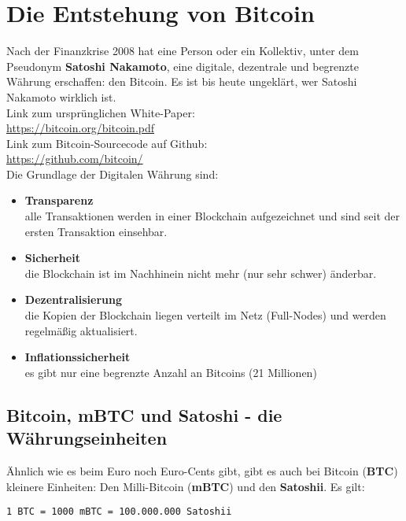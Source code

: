 \documentclass[10pt,a4paper,titlepage]{article}
\begin{document}
\section{Die Entstehung von Bitcoin}
Nach der Finanzkrise 2008 hat eine Person oder ein Kollektiv, unter dem Pseudonym \textbf{Satoshi Nakamoto}, eine digitale, dezentrale und begrenzte Währung erschaffen: den Bitcoin. Es ist bis heute ungeklärt, wer Satoshi Nakamoto wirklich ist.\vspace{.3cm}\\
Link zum ursprünglichen White-Paper:\\
\href{https://bitcoin.org/bitcoin.pdf}{\color{blue}https://bitcoin.org/bitcoin.pdf}\vspace{.3cm}\\
Link zum Bitcoin-Sourcecode auf Github:\\
\href{https://github.com/bitcoin/}{\color{blue}https://github.com/bitcoin/} \vspace{.3cm}\\
Die Grundlage der Digitalen Währung sind:
\begin{itemize}
\item \textbf{Transparenz}\\alle Transaktionen werden in einer Blockchain aufgezeichnet und sind seit der ersten Transaktion einsehbar.
\item \textbf{Sicherheit}\\die Blockchain ist im Nachhinein nicht mehr (nur sehr schwer) änderbar.
\item \textbf{Dezentralisierung}\\die Kopien der Blockchain liegen verteilt im Netz (Full-Nodes) und werden regelmäßig aktualisiert.
\item \textbf{Inflationssicherheit}\\es gibt nur eine begrenzte Anzahl an Bitcoins (21 Millionen)  
\end{itemize} 

\subsection{Bitcoin, mBTC und Satoshi - die Währungseinheiten}
Ähnlich wie es beim Euro noch Euro-Cents gibt, gibt es auch bei Bitcoin (\textbf{BTC}) kleinere Einheiten: Den Milli-Bitcoin (\textbf{mBTC}) und den \textbf{Satoshii}. Es gilt:
\begin{center}
\verb|1 BTC = 1000 mBTC = 100.000.000 Satoshii|
\end{center} 
\end{document}
